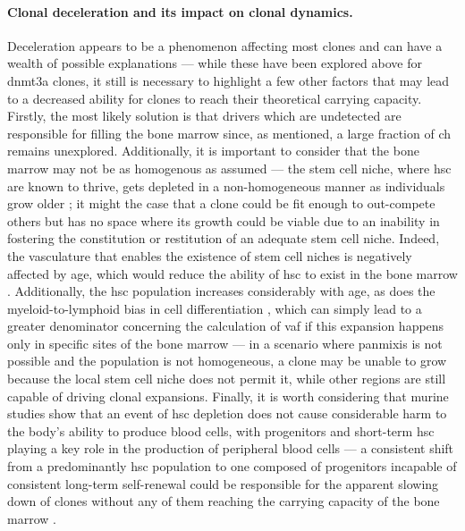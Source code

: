 \paragraph{Clonal deceleration and its impact on clonal dynamics.} Deceleration appears to be a phenomenon affecting most clones and can have a wealth of possible explanations --- while these have been explored above for \ac{dnmt3a} clones, it still is necessary to highlight a few other factors that may lead to a decreased ability for clones to reach their theoretical carrying capacity. Firstly, the most likely solution is that drivers which are undetected are responsible for filling the bone marrow since, as mentioned, a large fraction of \ac{ch} remains unexplored. Additionally, it is important to consider that the bone marrow may not be as homogenous as assumed --- the stem cell niche, where \ac{hsc} are known to thrive, gets depleted in a non-homogeneous manner as individuals grow older \cite{Crane2017-hl}; it might the case that a clone could be fit enough to out-compete others but has no space where its growth could be viable due to an inability in fostering the constitution or restitution of an adequate stem cell niche. Indeed, the vasculature that enables the existence of stem cell niches is negatively affected by age, which would reduce the ability of \ac{hsc} to exist in the bone marrow \cite{Tanaka2017-pu,Wang2017-rg}. Additionally, the \ac{hsc} population increases considerably with age, as does the myeloid-to-lymphoid bias in cell differentiation \cite{Pang2011-dw}, which can simply lead to a greater denominator concerning the calculation of \ac{vaf} if this expansion happens only in specific sites of the bone marrow --- in a scenario where panmixis is not possible and the population is not homogeneous, a clone may be unable to grow because the local stem cell niche does not permit it, while other regions are still capable of driving clonal expansions. Finally, it is worth considering that murine studies show that an event of \ac{hsc} depletion does not cause considerable harm to the body's ability to produce blood cells, with progenitors and short-term \ac{hsc} playing a key role in the production of peripheral blood cells --- a consistent shift from a predominantly \ac{hsc} population to one composed of progenitors incapable of consistent long-term self-renewal could be responsible for the apparent slowing down of clones without any of them reaching the carrying capacity of the bone marrow \cite{Schoedel2016-bi,Mitchell2021-zl}.

